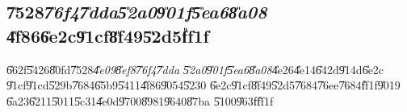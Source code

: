 \clearpage%

\subsection{\U{7528}\emph{\U{76f4}\U{7dda}\U{52a0}\U{901f}\U{5ea6}\U{8a08}}%
\U{4f86}\U{6e2c}\U{91cf}\U{8f49}\U{52d5}\U{ff1f}}

\U{662f}\U{5426}\U{80fd}\U{7528}\emph{\U{4e09}\U{8ef8}\U{76f4}\U{7dda}%
\U{52a0}\U{901f}\U{5ea6}\U{8a08}}\U{4e26}\U{4e14}\U{642d}\U{914d}\U{6e2c}%
\U{91cf}\U{91cd}\U{529b}\U{7684}\U{65b9}\U{5411}\U{4f86}\U{9054}\U{5230}%
\U{6e2c}\U{91cf}\U{8f49}\U{52d5}\U{7684}\U{76ee}\U{7684}\U{ff1f}\U{9019}%
\U{6a23}\U{6211}\U{5011}\U{5c31}\U{4e0d}\U{9700}\U{8981}\U{9640}\U{87ba}%
\U{5100}\U{963f}\U{ff1f}

